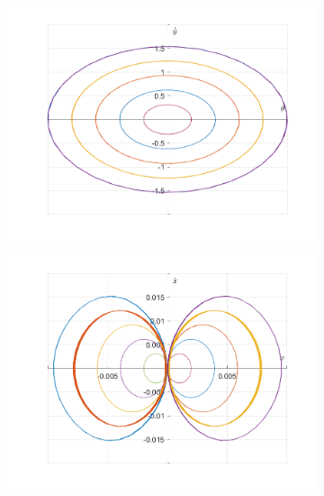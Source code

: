 \documentclass{article}
\begin{document}
	\begin{figure}[h!]
		\centering
		\begin{subfigure}[b]{0.48\linewidth}
			\includegraphics[width=\linewidth]{./SmallOscillations/S6/F5.png}
		\end{subfigure}
		\begin{subfigure}[b]{0.48\linewidth}
			\includegraphics[width=\linewidth]{./SmallOscillations/S6/F6.png}
		\end{subfigure}
	\end{figure}
	\newpage	
	
\end{document}
